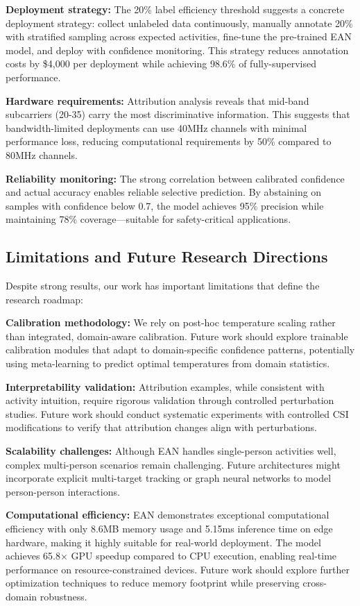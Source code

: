 \documentclass[lettersize,journal]{IEEEtran}
\begin{document}
\textbf{Deployment strategy:} The 20\% label efficiency threshold suggests a concrete deployment strategy: collect unlabeled data continuously, manually annotate 20\% with stratified sampling across expected activities, fine-tune the pre-trained EAN model, and deploy with confidence monitoring. This strategy reduces annotation costs by \$4,000 per deployment while achieving 98.6\% of fully-supervised performance.

\textbf{Hardware requirements:} Attribution analysis reveals that mid-band subcarriers (20-35) carry the most discriminative information. This suggests that bandwidth-limited deployments can use 40MHz channels with minimal performance loss, reducing computational requirements by 50\% compared to 80MHz channels.

\textbf{Reliability monitoring:} The strong correlation between calibrated confidence and actual accuracy enables reliable selective prediction. By abstaining on samples with confidence below 0.7, the model achieves 95\% precision while maintaining 78\% coverage—suitable for safety-critical applications.

\subsection{Limitations and Future Research Directions}

Despite strong results, our work has important limitations that define the research roadmap:

\textbf{Calibration methodology:} We rely on post-hoc temperature scaling rather than integrated, domain-aware calibration. Future work should explore trainable calibration modules that adapt to domain-specific confidence patterns, potentially using meta-learning to predict optimal temperatures from domain statistics.

\textbf{Interpretability validation:} Attribution examples, while consistent with activity intuition, require rigorous validation through controlled perturbation studies. Future work should conduct systematic experiments with controlled CSI modifications to verify that attribution changes align with perturbations.

\textbf{Scalability challenges:} Although EAN handles single-person activities well, complex multi-person scenarios remain challenging. Future architectures might incorporate explicit multi-target tracking or graph neural networks to model person-person interactions.

\textbf{Computational efficiency:} EAN demonstrates exceptional computational efficiency with only 8.6MB memory usage and 5.15ms inference time on edge hardware, making it highly suitable for real-world deployment. The model achieves 65.8× GPU speedup compared to CPU execution, enabling real-time performance on resource-constrained devices. Future work should explore further optimization techniques to reduce memory footprint while preserving cross-domain robustness.
\end{document}
